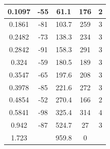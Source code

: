 \documentclass[14pt, a4paper,reqno]{article}
\begin{document}
\begin{center}
\begin{tabular}{|c|c|c|c|c|}
            0.1097   & -55            & 61.1	& 176             & 2  \\ \hline
            0.1861   & -81            & 103.7	& 259             & 3  \\ \hline
            0.2482   & -73            & 138.3	& 234             & 3  \\ \hline
            0.2842   & -91            & 158.3	& 291             & 3  \\ \hline
            0.324    & -59            & 180.5	& 189             & 3  \\ \hline
            0.3547   & -65            & 197.6	& 208             & 3  \\ \hline
            0.3978   & -85            & 221.6	& 272             & 3  \\ \hline
            0.4854   & -52            & 270.4	& 166             & 2  \\ \hline
            0.5841   & -98            & 325.4	& 314             & 4  \\ \hline
            0.942    & -87            & 524.7	& 27              & 3  \\ \hline
            1.723    &                & 959.8	& 0               &    \\ \hline
        \end{tabular}
    \end{center}
\end{document}
